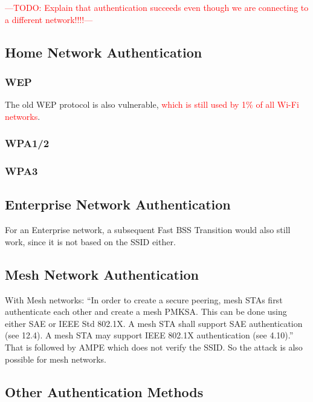 \documentclass[sigconf,review]{acmart}
\newcommand{\wifi}{\mbox{Wi-Fi}}
\DeclareRobustCommand{\red}[1]{\textcolor{red}{#1}}
\begin{document}
\red{---TODO: Explain that authentication succeeds even though we are connecting to a different network!!!!---}



\subsection{Home Network Authentication}

\subsubsection{WEP}
The old WEP protocol is also vulnerable, \red{which is still used by 1\% of all \wifi{} networks}.

\subsubsection{WPA1/2}

\subsubsection{WPA3}

\subsection{Enterprise Network Authentication} %

For an Enterprise network, a subsequent Fast BSS Transition would also still work, since it is not based on the SSID either.

\subsection{Mesh Network Authentication}

With Mesh networks: ``In order to create a secure peering, mesh STAs first authenticate each other and create a mesh PMKSA. This can be done using either SAE or IEEE Std 802.1X. A mesh STA shall support SAE authentication (see 12.4). A mesh STA may support IEEE 802.1X authentication (see 4.10).''
That is followed by AMPE which does not verify the SSID.
So the attack is also possible for mesh networks.

\subsection{Other Authentication Methods}
\end{document}
